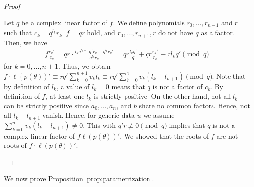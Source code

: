 \begin{proof}
\begin{itemize}
        Let \( q \) be a complex linear factor of \( f \). We define polynomials \( r_0, \dots, r_{n+1} \) and \( r \) such that \( c_k = q^{l_k}r_k \), \( f = q r \) hold, and \( r_0, \dots, r_{n+1}, r \) do not have \( q \) as a factor. Then, we have
        \begin{align*}
            f \frac{c_k'}{c_k} = q r \cdot \frac{l_k q^{l_k - 1} q'r_k +  q^{l_k}r_k'}{q^{l_k}r_k} = q r\frac{l_k q' }{q} + q r\frac{r_k'}{r_k} \equiv rl_k q' \pmod q
        \end{align*}
        for \(  k = 0, \dots, n+1 \).
        Thus, we obtain \( f \cdot \ell(p(\theta))' \equiv rq'\sum_{k=0}^{n + 1} v_k l_k \equiv rq' \sum_{k=0}^{n } v_k(l_k - l_{n+1}) \pmod q \).
        Note that by definition of \( l_k \), a value of \( l_k = 0 \) means that \( q \) is not a factor of \( c_k \). By definition of \( f \), at least one \( l_k \) is strictly positive. On the other hand, not all \( l_k \) can be strictly positive since \( a_0, \dots, a_n\), and \(b \) share no common factors. Hence, not all \( l_k - l_{n+1} \) vanish. Hence, for generic data \( u \) we assume \( \sum_{k=0}^{n } v_k(l_k - l_{n+1}) \neq 0 \). This with \( q'r \not \equiv 0 \pmod q \) implies that \( q \) is not a complex linear factor of \( f  \ell(p(\theta))' \). We showed that the roots of \( f \) are not roots of \( f \cdot \ell(p(\theta))' \).
    \end{itemize}
\end{proof}

We now prove Proposition \ref{prop:parametrization}.

